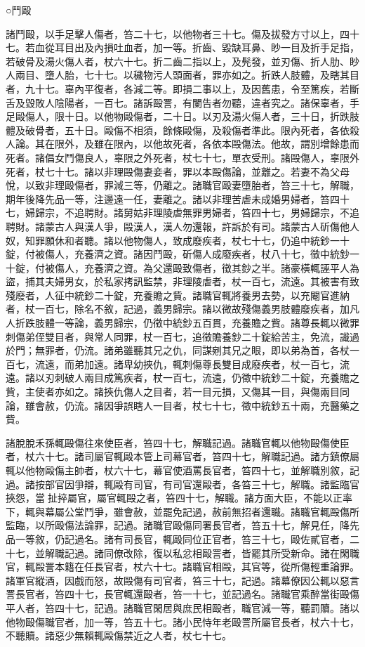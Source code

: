 \begin{pinyinscope}
 ○鬥毆



 諸鬥毆，以手足擊人傷者，笞二十七，以他物者三十七。傷及拔發方寸以上，四十七。若血從耳目出及內損吐血者，加一等。折齒、毀缺耳鼻、眇一目及折手足指，若破骨及湯火傷人者，杖六十七。折二齒二指以上，及髡發，並刃傷、折人肋、眇人兩目、墮人胎，七十七。以穢物污人頭面者，罪亦如之。折跌人肢體，及瞎其目者，九十七。辜內平復者，各減二等。即損二事以上，及因舊患，令至篤疾，若斷舌及毀敗人陰陽者，一百七。諸訴毆詈，有闌告者勿聽，違者究之。諸保辜者，手足毆傷人，限十日。以他物毆傷者，二十日。以刃及湯火傷人者，三十日，折跌肢體及破骨者，五十日。毆傷不相須，餘條毆傷，及殺傷者準此。限內死者，各依殺人論。其在限外，及雖在限內，以他故死者，各依本毆傷法。他故，謂別增餘患而死者。諸倡女鬥傷良人，辜限之外死者，杖七十七，單衣受刑。諸毆傷人，辜限外死者，杖七十七。諸以非理毆傷妻妾者，罪以本毆傷論，並離之。若妻不為父母悅，以致非理毆傷者，罪減三等，仍離之。諸職官毆妻墮胎者，笞三十七，解職，期年後降先品一等，注邊遠一任，妻離之。諸以非理苦虐未成婚男婦者，笞四十七，婦歸宗，不追聘財。諸舅姑非理陵虐無罪男婦者，笞四十七，男婦歸宗，不追聘財。諸蒙古人與漢人爭，毆漢人，漢人勿還報，許訴於有司。諸蒙古人斫傷他人奴，知罪願休和者聽。諸以他物傷人，致成廢疾者，杖七十七，仍追中統鈔一十錠，付被傷人，充養濟之資。諸因鬥毆，斫傷人成廢疾者，杖八十七，徵中統鈔一十錠，付被傷人，充養濟之資。為父還毆致傷者，徵其鈔之半。諸豪橫輒誣平人為盜，捕其夫婦男女，於私家拷訊監禁，非理陵虐者，杖一百七，流遠。其被害有致殘廢者，人征中統鈔二十錠，充養贍之貲。諸職官輒將養男去勢，以充閹官進納者，杖一百七，除名不敘，記過，義男歸宗。諸以微故殘傷義男肢體廢疾者，加凡人折跌肢體一等論，義男歸宗，仍徵中統鈔五百貫，充養贍之貲。諸尊長輒以微罪刺傷弟侄雙目者，與常人同罪，杖一百七，追徵贍養鈔二十錠給苦主，免流，識過於門；無罪者，仍流。諸弟雖聽其兄之仇，同謀剜其兄之眼，即以弟為首，各杖一百七，流遠，而弟加遠。諸卑幼挾仇，輒刺傷尊長雙目成廢疾者，杖一百七，流遠。諸以刃刺破人兩目成篤疾者，杖一百七，流遠，仍徵中統鈔二十錠，充養贍之貲，主使者亦如之。諸挾仇傷人之目者，若一目元損，又傷其一目，與傷兩目同論，雖會赦，仍流。諸因爭誤瞎人一目者，杖七十七，徵中統鈔五十兩，充醫藥之貲。



 諸脫脫禾孫輒毆傷往來使臣者，笞四十七，解職記過。諸職官輒以他物毆傷使臣者，杖六十七。諸司屬官輒毆本管上司幕官者，笞四十七，解職記過。諸方鎮僚屬輒以他物毆傷主帥者，杖六十七，幕官使酒罵長官者，笞四十七，並解職別敘，記過。諸按部官因爭辯，輒毆有司官，有司官還毆者，各笞三十七，解職。諸監臨官挾怨，當扯捽屬官，屬官輒毆之者，笞四十七，解職。諸方面大臣，不能以正率下，輒與幕屬公堂鬥爭，雖會赦，並罷免記過，赦前無招者還職。諸職官輒毆傷所監臨，以所毆傷法論罪，記過。諸職官毆傷同署長官者，笞五十七，解見任，降先品一等敘，仍記過名。諸有司長官，輒毆同位正官者，笞三十七，毆佐貳官者，二十七，並解職記過。諸同僚改除，復以私忿相毆詈者，皆罷其所受新命。諸在閑職官，輒毆詈本籍在任長官者，杖六十七。諸職官相毆，其官等，從所傷輕重論罪。諸軍官縱酒，因戲而怒，故毆傷有司官者，笞三十七，記過。諸幕僚因公輒以惡言詈長官者，笞四十七，長官輒還毆者，笞一十七，並記過名。諸職官乘醉當街毆傷平人者，笞四十七，記過。諸職官閑居與庶民相毆者，職官減一等，聽罰贖。諸以他物毆傷職官者，加一等，笞五十七。諸小民恃年老毆詈所屬官長者，杖六十七，不聽贖。諸惡少無賴輒毆傷禁近之人者，杖七十七。




\end{pinyinscope}
